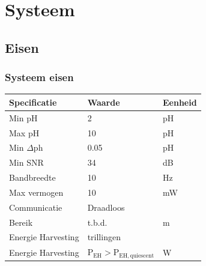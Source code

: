 \section{Systeem}
    \subsection*{Eisen}
    \begin{frame}
        \frametitle{Systeem eisen}
    
        \begin{table}[h]
            \centering
            \begin{tabular}{l|l|l}
                Specificatie        & Waarde        & Eenheid   \\\hline
                Min pH              & 2             & pH        \\
                Max pH              & 10            & pH        \\
                Min $\Delta$ph      & 0.05          & pH        \\
                Min SNR             & 34            & dB        \\\hline
                Bandbreedte         & 10            & Hz        \\\hline
                Max vermogen        & 10            & mW        \\\hline
                Communicatie        & Draadloos     &           \\
                Bereik              & t.b.d.        & m         \\\hline
                Energie Harvesting  & trillingen    &           \\ 
                Energie Harvesting  & $\mathrm{P}_{\mathrm{EH}} > \mathrm{P}_{\mathrm{EH,quiescent}}$ & W         \\
            \end{tabular}
        \end{table}
    
    \end{frame}
    
